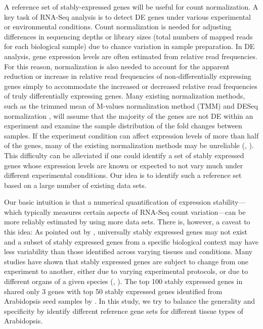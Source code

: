 \documentclass[11pt, a4paper]{article}
\begin{document}
A reference set of stably-expressed genes will be useful for count
normalization.  A key task of RNA-Seq analysis is to detect DE genes under
various experimental or environmental conditions. Count normalization is
needed for adjusting differences in sequencing depths or library sizes (total
numbers of mapped reads for each biological sample) due to chance variation in
sample preparation.  In DE analysis, gene expression levels are often
estimated from relative read frequencies. For this reason, normalization is
also needed to account for the apparent reduction or increase in relative read
frequencies of non-differentially expressing genes simply to accommodate the
increased or decreased relative read frequencies of truly differentially
expressing genes.  Many existing normalization methods, such as the trimmed
mean of M-values normalization method (TMM) \citep{robinson2010scaling} and
DESeq normalization \citep{anders2010differential}, will  assume that the
majority of the genes are not DE within an experiment and examine the sample
distribution of the fold changes between samples.
If the experiment condition can affect expression levels of more than half of
the genes, many of the existing normalization methods may be unreliable
(\cite{loven2012revisiting}, \cite{wu2013use}).  This difficulty can be
alleviated if one could identify a set of stably expressed genes whose
expression levels are known or expected to not vary much under different
experimental conditions. Our idea is to identify such a reference set based on
a large number of existing data sets.

Our basic intuition is that a numerical quantification of expression
stability---which typically measures certain aspects of RNA-Seq count
variation---can be more reliably estimated by using more data sets.  There is,
however, a caveat to this idea: As pointed out by \cite{hruz2011refgenes},
universally stably expressed genes may not exist and a subset of stably
expressed genes from a specific biological context may have less variability
than those identified across varying tissues and conditions.  Many studies
have shown that stably expressed genes are subject to change from one
experiment to another, either due to varying experimental protocols, or due to
different organs of a given species (\cite{reid2006optimized},
\cite{hong2010identification}).  The top 100 stably expressed genes in
\cite{czechowski2005genome} shared only 3 genes with top 50 stably expressed
genes identified from Arabidopsis seed samples by \cite{dekkers2012identification}.  In this
study, we try to balance the generality and specificity by identify different
reference gene sets for different tissue types of Arabidopsis. 
\end{document}
